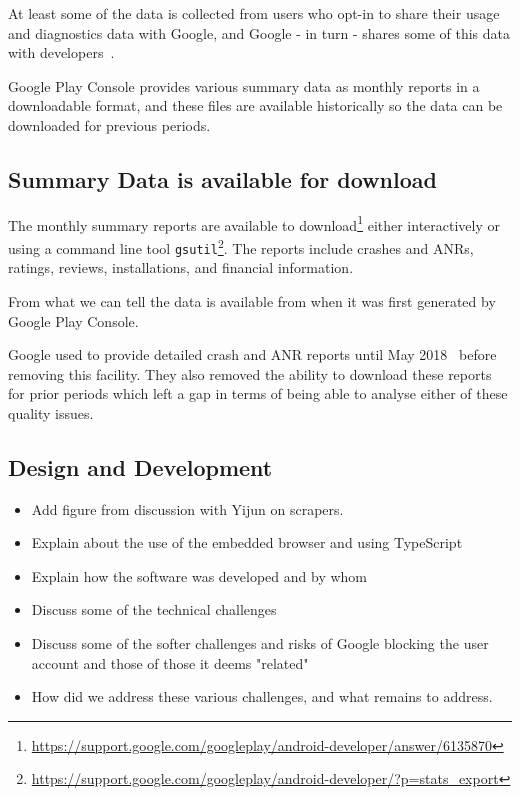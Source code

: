At least some of the data is collected from users who opt-in to share their usage and diagnostics data with Google, and Google - in turn - shares some of this data with developers~\cite{google_play_share_usage_and_diagnostics_info_with_google}.

Google Play Console provides various summary data as monthly reports in a downloadable format, and these files are available historically so the data can be downloaded for previous periods. 

\subsection{Summary Data is available for download}
The monthly summary reports are available to download\footnote{\url{https://support.google.com/googleplay/android-developer/answer/6135870}} either interactively or using a command line tool \texttt{gsutil}\footnote{\url{https://support.google.com/googleplay/android-developer/?p=stats\_export}}. The reports include crashes and ANRs, ratings, reviews, installations, and financial information. 

From what we can tell the data is available from when it was first generated by Google Play Console.

Google used to provide detailed crash and ANR reports until May 2018~\cite{google_play_download_and_export_monthly_reports} before removing this facility. They also removed the ability to download these reports for prior periods which left a gap in terms of being able to analyse either of these quality issues.

\subsection{Design and Development}
\begin{itemize}
    \item Add figure from discussion with Yijun on scrapers.
    \item Explain about the use of the embedded browser and using TypeScript
    \item Explain how the software was developed and by whom
    \item Discuss some of the technical challenges
    \item Discuss some of the softer challenges and risks of Google blocking the user account and those of those it deems "related"
    \item How did we address these various challenges, and what remains to address.
\end{itemize}

